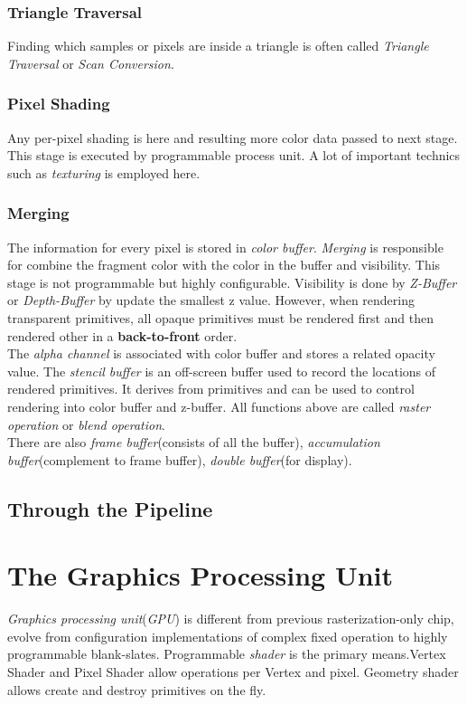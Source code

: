 \documentclass[10pt, a4paper]{article}
\begin{document}
            \subsubsection{Triangle Traversal} 
            Finding which samples or pixels are inside a triangle is often called \emph{Triangle Traversal} or \emph{Scan Conversion}.
            
            \subsubsection{Pixel Shading} 
            Any per-pixel shading is here and resulting more color data passed to next stage. This stage is executed by programmable process unit. A lot of important technics such as \emph{texturing} is employed here. 

            \subsubsection{Merging} 
            The information for every pixel is stored in \emph{color buffer}. \emph{Merging} is responsible for combine the fragment color with the color in the buffer and visibility. This stage is not programmable but highly configurable. Visibility is done by \emph{Z-Buffer} or \emph{Depth-Buffer} by update the smallest z value. However, when rendering transparent primitives, all opaque primitives must be rendered first and then rendered other in a \textbf{back-to-front} order. \\
            \indent The \emph{alpha channel} is associated with color buffer and stores a related opacity value. The \emph{stencil buffer} is an off-screen buffer used to record the locations of rendered primitives. It derives from primitives and can be used to control rendering into color buffer and z-buffer. All functions above are called \emph{raster operation} or \emph{blend operation}.\\
            \indent There are also \emph{frame buffer}(consists of all the buffer), \emph{accumulation buffer}(complement to frame buffer), \emph{double buffer}(for display).
    
        \subsection{Through the Pipeline}
        \newpage
    


    \section{The Graphics Processing Unit}
        \emph{Graphics processing unit}(\emph{GPU}) is different from previous rasterization-only chip, evolve from configuration implementations of complex fixed operation to highly programmable blank-slates. Programmable \emph{shader} is the primary means.Vertex Shader and Pixel Shader allow operations per Vertex and pixel. Geometry shader allows create and destroy primitives on the fly. 
        
\end{document}
